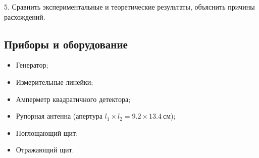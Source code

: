 5. Сравнить экспериментальные и теоретические результаты, объяснить причины расхождений.

\subsection*{Приборы и оборудование} 
\begin{itemize}
	\item Генератор;
	\item Измерительные линейки;
	\item Амперметр квадратичного детектора;
	\item Рупорная антенна (апертура $l_1 \times l_2 = 9.2 \times 13.4~\text{см}$);
	\item Поглощающий щит;
	\item Отражающий щит.
\end{itemize}
